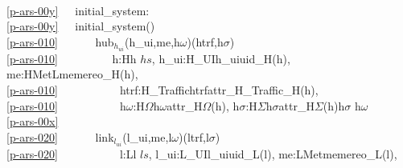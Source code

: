 {%
\bp
{}\\
\ref{p-ars-00y}\ \ \ initial\_system:  {\RIGHTARROW}  \\
\ref{p-ars-00y}\ \ \ initial\_system() {\IS}\\
\ref{p-ars-010}\ \ \ \ \ \ {\PARL} {\LBRACE} hub$_{h_{ui}}$(h\_ui,me,h$\omega$)(htrf,h$\sigma$) \\
\ref{p-ars-010}\ \ \ \ \ \ \ \ \ {\BAR} h:H{\RDOT}h {\ISIN} $hs$, h\_ui:H\_UI{\RDOT}h\_ui{\EQ}uid\_H(h), me:HMetL{\RDOT}me{\EQ}mereo\_H(h),\\
\ref{p-ars-010}\ \ \ \ \ \ \ \ \ \ \ htrf:H\_Traffic{\RDOT}htrf{\EQ}attr\_H\_Traffic\_H(h),\\
\ref{p-ars-010}\ \ \ \ \ \ \ \ \ \ \ h$\omega$:H$\Omega${\RDOT}h$\omega${\EQ}attr\_H$\Omega$(h), h$\sigma$:H$\Sigma${\RDOT}h$\sigma${\EQ}attr\_H$\Sigma$(h){\WEDGE}h$\sigma$ {\ISIN} h$\omega$ {\RBRACE}\ \ \ \ \ \ \ \\
\ref{p-ars-00x}\ \ \ \ \ \ {\PARL} \\
\ref{p-ars-020}\ \ \ \ \ \ {\PARL} {\LBRACE} link$_{l_{ui}}$(l\_ui,me,l$\omega$)(ltrf,l$\sigma$)\\
\ref{p-ars-020}\ \ \ \ \ \ \ \ \ \ \ l:L{\RDOT}l {\ISIN} $ls$, l\_ui:L\_UI{\RDOT}l\_ui{\EQ}uid\_L(l), me:LMet{\RDOT}me{\EQ}mereo\_L(l),\\
}
